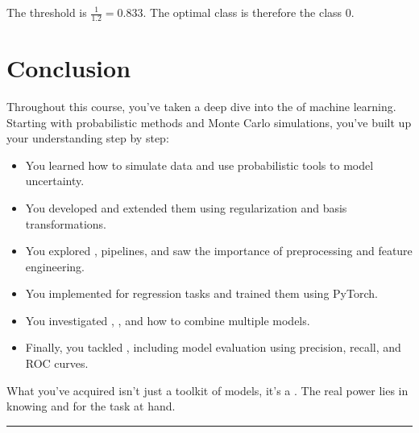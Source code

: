 \documentclass[letterpaper,10pt,english]{jupyterBook}
\begin{document}
\sphinxAtStartPar
The threshold is \(\frac{1}{1.2} = 0.833\). The optimal class is therefore the class \(0\).

\sphinxstepscope


\chapter{Conclusion}
\label{\detokenize{conclusion:conclusion}}\label{\detokenize{conclusion::doc}}
\sphinxAtStartPar
Throughout this course, you’ve taken a deep dive into the  of machine learning. Starting with probabilistic methods and Monte Carlo simulations, you’ve built up your understanding step by step:
\begin{itemize}
\item {} 
\sphinxAtStartPar
You learned how to simulate data and use probabilistic tools to model uncertainty.

\item {} 
\sphinxAtStartPar
You developed  and extended them using regularization and basis transformations.

\item {} 
\sphinxAtStartPar
You explored , pipelines, and saw the importance of preprocessing and feature engineering.

\item {} 
\sphinxAtStartPar
You implemented  for regression tasks and trained them using PyTorch.

\item {} 
\sphinxAtStartPar
You investigated , , and how to combine multiple models.

\item {} 
\sphinxAtStartPar
Finally, you tackled , including model evaluation using precision, recall, and ROC curves.

\end{itemize}

\sphinxAtStartPar
What you’ve acquired isn’t just a toolkit of models, it’s a . The real power lies in knowing  and  for the task at hand.


\bigskip\hrule\bigskip
\end{document}
